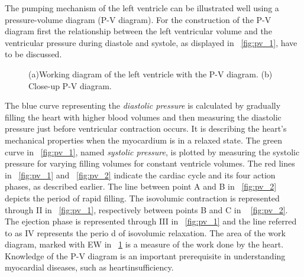 The pumping mechanism of the left ventricle can be illustrated well using a pressure-volume diagram (P-V diagram). For the construction of the P-V diagram first the relationship between the left ventricular volume and the ventricular pressure during diastole and systole, as displayed in \figurename~\ref{fig:pv_1}, have to be discussed.
\begin{figure}[h]
  \caption{(a)Working diagram of the left ventricle with the P-V diagram. (b) Close-up P-V diagram. \cite{GH20}}
  \label{fig:pv}
\end{figure}
The blue curve representing the \textit{diastolic pressure} is calculated by gradually filling the heart with higher blood volumes and then measuring the diastolic pressure just before ventricular contraction occurs. It is describing the heart's mechanical properties when the myocardium is in a relaxed state. The green curve in \figurename~\ref{fig:pv_1}, named \textit{systolic pressure}, is plotted by measuring the systolic pressure for varying filling volumes for constant ventricle volumes. The red lines in \figurename~\ref{fig:pv_1} and \figurename~\ref{fig:pv_2} indicate the cardiac cycle and its four action phases, as described earlier. The line between point A and B in \figurename~\ref{fig:pv_2} depicts the period of rapid filling. The isovolumic contraction is represented through II in \figurename~\ref{fig:pv_1}, respectively between points B and C in \figurename~ \ref{fig:pv_2}. The ejection phase is represented through III in \figurename~\ref{fig:pv_1} and the line referred to as IV represents the perio d of isovolumic relaxation. The area of the work diagram, marked with EW in \figurename~\ref{fig:pv} is a measure of the work done by the heart. Knowledge of the P-V diagram is an important prerequisite in understanding myocardial diseases, such as heartinsufficiency. \cite{HKS4}

